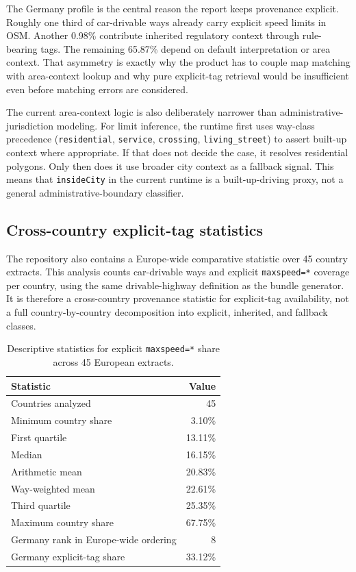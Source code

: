 \documentclass{article}
\begin{document}
The Germany profile is the central reason the report keeps provenance explicit. Roughly one third of car-drivable ways already carry explicit speed limits in OSM. Another 0.98\% contribute inherited regulatory context through rule-bearing tags. The remaining 65.87\% depend on default interpretation or area context. That asymmetry is exactly why the product has to couple map matching with area-context lookup and why pure explicit-tag retrieval would be insufficient even before matching errors are considered.

The current area-context logic is also deliberately narrower than administrative-jurisdiction modeling. For limit inference, the runtime first uses way-class precedence (\texttt{residential}, \texttt{service}, \texttt{crossing}, \texttt{living\_street}) to assert built-up context where appropriate. If that does not decide the case, it resolves residential polygons. Only then does it use broader city context as a fallback signal. This means that \texttt{insideCity} in the current runtime is a built-up-driving proxy, not a general administrative-boundary classifier.

\subsection{Cross-country explicit-tag statistics}
The repository also contains a Europe-wide comparative statistic over 45 country extracts. This analysis counts car-drivable ways and explicit \texttt{maxspeed=*} coverage per country, using the same drivable-highway definition as the bundle generator. It is therefore a cross-country provenance statistic for explicit-tag availability, not a full country-by-country decomposition into explicit, inherited, and fallback classes.

\begin{table}[!htbp]
\centering
\caption{Descriptive statistics for explicit \texttt{maxspeed=*} share across 45 European extracts.}
\label{tab:europe_maxspeed_summary}
\begin{tabular}{p{7.2cm}r}
\toprule
Statistic & Value \\
\midrule
Countries analyzed & 45 \\
Minimum country share & 3.10\% \\
First quartile & 13.11\% \\
Median & 16.15\% \\
Arithmetic mean & 20.83\% \\
Way-weighted mean & 22.61\% \\
Third quartile & 25.35\% \\
Maximum country share & 67.75\% \\
Germany rank in Europe-wide ordering & 8 \\
Germany explicit-tag share & 33.12\% \\
\bottomrule
\end{tabular}
\end{table}
\end{document}
